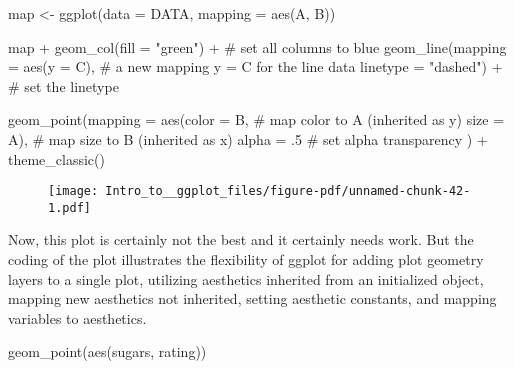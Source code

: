 \documentclass[
  letterpaper,
  DIV=11,
  numbers=noendperiod]{scrartcl}
\newenvironment{Shaded}{\begin{snugshade}}{\end{snugshade}}
\newcommand{\AttributeTok}[1]{\textcolor[rgb]{0.40,0.45,0.13}{#1}}
\newcommand{\CommentTok}[1]{\textcolor[rgb]{0.37,0.37,0.37}{#1}}
\newcommand{\DecValTok}[1]{\textcolor[rgb]{0.68,0.00,0.00}{#1}}
\newcommand{\FunctionTok}[1]{\textcolor[rgb]{0.28,0.35,0.67}{#1}}
\newcommand{\NormalTok}[1]{\textcolor[rgb]{0.00,0.23,0.31}{#1}}
\newcommand{\OtherTok}[1]{\textcolor[rgb]{0.00,0.23,0.31}{#1}}
\newcommand{\SpecialCharTok}[1]{\textcolor[rgb]{0.37,0.37,0.37}{#1}}
\newcommand{\StringTok}[1]{\textcolor[rgb]{0.13,0.47,0.30}{#1}}
\begin{document}
\begin{Shaded}
\begin{Highlighting}[]
\NormalTok{map }\OtherTok{\textless{}{-}} \FunctionTok{ggplot}\NormalTok{(}\AttributeTok{data =}\NormalTok{ DATA, }
              \AttributeTok{mapping =} \FunctionTok{aes}\NormalTok{(A, B))}

\NormalTok{map }\SpecialCharTok{+} 
  \FunctionTok{geom\_col}\NormalTok{(}\AttributeTok{fill =} \StringTok{"green"}\NormalTok{) }\SpecialCharTok{+}            \CommentTok{\# set all columns to blue}
  \FunctionTok{geom\_line}\NormalTok{(}\AttributeTok{mapping =} \FunctionTok{aes}\NormalTok{(}\AttributeTok{y =}\NormalTok{ C),      }\CommentTok{\# a new mapping y = C for the line data}
            \AttributeTok{linetype =} \StringTok{"dashed"}\NormalTok{) }\SpecialCharTok{+}     \CommentTok{\# set the linetype}
            
  \FunctionTok{geom\_point}\NormalTok{(}\AttributeTok{mapping =} \FunctionTok{aes}\NormalTok{(}\AttributeTok{color =}\NormalTok{ B,  }\CommentTok{\# map color to A (inherited as y)  }
                           \AttributeTok{size =}\NormalTok{ A),  }\CommentTok{\# map size to B (inherited as x)}
            \AttributeTok{alpha =}\NormalTok{ .}\DecValTok{5}                 \CommentTok{\# set alpha transparency}
\NormalTok{            ) }\SpecialCharTok{+}
  \FunctionTok{theme\_classic}\NormalTok{()}
\end{Highlighting}
\end{Shaded}

\begin{figure}[H]

{\centering \texttt{[image: Intro\_to\_\_ggplot\_files/figure-pdf/unnamed-chunk-42-1.pdf]}

}

\end{figure}

Now, this plot is certainly not the best and it certainly needs work.
But the coding of the plot illustrates the flexibility of ggplot for
adding plot geometry layers to a single plot, utilizing aesthetics
inherited from an initialized object, mapping new aesthetics not
inherited, setting aesthetic constants, and mapping variables to
aesthetics.

\begin{Shaded}
\begin{Highlighting}[]
 \FunctionTok{geom\_point}\NormalTok{(}\FunctionTok{aes}\NormalTok{(sugars, rating))}
\end{Highlighting}
\end{Shaded}
\end{document}
